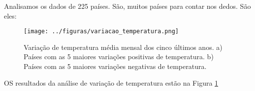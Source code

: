\documentclass{article}
\begin{document}
Analisamos os dados de 225 países. São, muitos países para contar nos dedos.
São eles: \Paises

\begin{figure}[!tb]
    \centering
    \texttt{[image: ../figuras/variacao\_temperatura.png]}
    \caption{
    Variação de temperatura média mensal dos cinco últimos anos.
    a) Países com as 5 maiores variações positivas de temperatura.
    b) Países com as 5 maiores variações negativas de temperatura.
    }
    \label{fig:variacao}
\end{figure}

OS resultados da análise de variação de temperatura estão na Figura \ref{fig:variacao}



\end{document}
